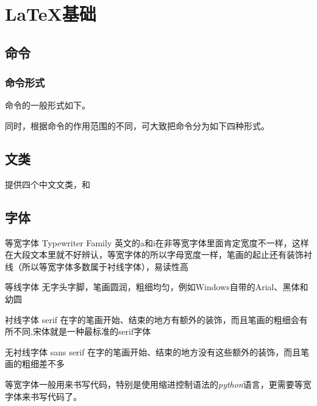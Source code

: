 {\let\clearpage\relax \chapter{\LaTeX 基础}}

\section{命令}

\subsection{命令形式}

命令的一般形式如下。

\begin{latex}
\end{latex}

同时，根据命令的作用范围的不同，可大致把命令分为如下四种形式。

\section{文类}

\CTeX 提供四个中文文类，和

\section{字体}

\begin{asparadesc}
	\item[等宽字体] Typewriter Family 英文的a和i在非等宽字体里面肯定宽度不一样，这样在大段文本里就不好辨认，等宽字体的所以字母宽度一样，笔画的起止还有装饰衬线（所以等宽字体多数属于衬线字体），易读性高
	\item[等线字体] 无字头字脚，笔画圆润，粗细均匀，例如Windows自带的Arial、黑体和幼圆
	\item[衬线字体] serif 在字的笔画开始、结束的地方有额外的装饰，而且笔画的粗细会有所不同,宋体就是一种最标准的serif字体
	\item[无衬线字体] sans serif 在字的笔画开始、结束的地方没有这些额外的装饰，而且笔画的粗细差不多
\end{asparadesc}

等宽字体一般用来书写代码，特别是使用缩进控制语法的\emph{python}语言，更需要等宽字体来书写代码了。

